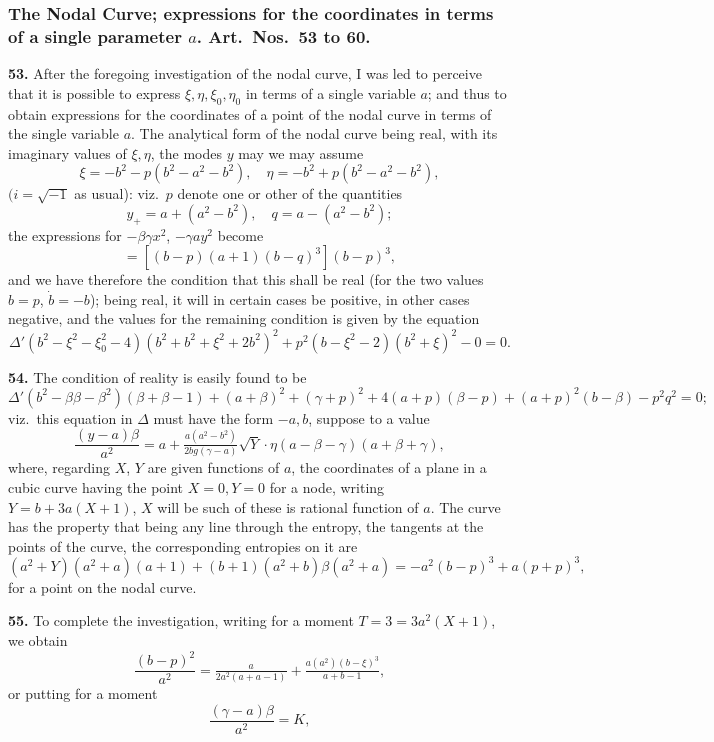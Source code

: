 \documentclass[11pt,a4paper]{book}
\begin{document}
\subsubsection*{The Nodal Curve; expressions for the coordinates in terms of a single parameter $a$. Art.\ Nos.\ 53 to 60.}

\textbf{53.} After the foregoing investigation of the nodal curve, I was led to perceive that it is possible to express $\xi, \eta, \xi_0, \eta_0$ in terms of a single variable $a$; and thus to obtain expressions for the coordinates of a point of the nodal curve in terms of the single variable $a$. The analytical form of the nodal curve being real, with its imaginary values of $\xi, \eta$, the modes $y$ may we may assume
\[
\xi = -b^2 - p(b^2 - a^2 - b^2),\quad \eta = -b^2 + p(b^2 - a^2 - b^2),
\]
$(i = \sqrt{-1}$ as usual): viz.\ $p$ denote one or other of the quantities
\[
y_+ = a + (a^2 - b^2),\quad q = a - (a^2 - b^2);
\]
the expressions for $-\beta\gamma x^2$, $-\gamma a y^2$ become
\[
= [(b - p)(a + 1)(b - q)^3](b - p)^3,
\]
and we have therefore the condition that this shall be real (for the two values $b = p$, $\dot{b} = -b$); being real, it will in certain cases be positive, in other cases negative, and the values for the remaining condition is given by the equation
\[
\Delta'(b^2 - \xi^2 - \xi_0^2 - 4)(b^2 + b^2 + \xi^2 + 2b^2)^2 + p^2(b - \xi^2 - 2)(b^2 + \xi)^2 - 0 = 0.
\]

\textbf{54.} The condition of reality is easily found to be
\[
\Delta'(b^2 - \beta\beta - \beta^2)(\beta + \beta - 1) + (a + \beta)^2 + (\gamma + p)^2 + 4(a + p)(\beta - p) + (a + p)^2(b - \beta) - p^2 q^2 = 0;
\]
viz.\ this equation in $\Delta$ must have the form $-a, b$, suppose to a value
\[
\frac{(y - a)\beta}{a^2} = a + \tfrac{a(a^2 - b^2)}{2bg(\gamma - a)}\sqrt{Y}\cdot\eta(a - \beta - \gamma)(a + \beta + \gamma),
\]
where, regarding $X$, $Y$ are given functions of $a$, the coordinates of a plane in a cubic curve having the point $X = 0, Y = 0$ for a node, writing $Y = b + 3a(X + 1)$, $X$ will be such of these is rational function of $a$. The curve has the property that being any line through the entropy, the tangents at the points of the curve, the corresponding entropies on it are
\[
(a^2 + Y)(a^2 + a)(a + 1) + (b + 1)(a^2 + b)\beta(a^2 + a) = -a^2(b - p)^3 + a(p + p)^3,
\]
for a point on the nodal curve.

\textbf{55.} To complete the investigation, writing for a moment $T = 3 = 3a^2(X + 1)$, we obtain
\[
\frac{(b - p)^2}{a^2} = \tfrac{a}{2a^2(a + a - 1)} + \tfrac{a(a^2)(b - \xi)^3}{a + b - 1},
\]
or putting for a moment
\[
\frac{(\gamma - a)\beta}{a^2} = K,
\]
\end{document}
